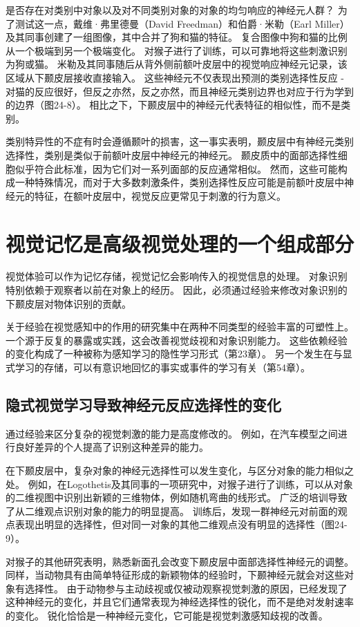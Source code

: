 是否存在对类别中对象以及对不同类别对象的对象的均匀响应的神经元人群？ 为了测试这一点，戴维·弗里德曼（David Freedman）和伯爵·米勒（Earl Miller）及其同事创建了一组图像，其中合并了狗和猫的特征。 复合图像中狗和猫的比例从一个极端到另一个极端变化。 对猴子进行了训练，可以可靠地将这些刺激识别为狗或猫。 米勒及其同事随后从背外侧前额叶皮层中的视觉响应神经元记录，该区域从下颞皮层接收直接输入。 这些神经元不仅表现出预测的类别选择性反应 - 对猫的反应很好，但反之亦然，反之亦然，而且神经元类别边界也对应于行为学到的边界（图24-8）。 相比之下，下颞皮层中的神经元代表特征的相似性，而不是类别。

类别特异性的不症有时会遵循颞叶的损害，这一事实表明，颞皮层中有神经元类别选择性，类别是类似于前额叶皮层中神经元的神经元。 颞皮质中的面部选择性细胞似乎符合此标准，因为它们对一系列面部的反应通常相似。 然而，这些可能构成一种特殊情况，而对于大多数刺激条件，类别选择性反应可能是前额叶皮层中神经元的特征，在额叶皮层中，视觉反应更常见于刺激的行为意义。

\section{视觉记忆是高级视觉处理的一个组成部分}
视觉体验可以作为记忆存储，视觉记忆会影响传入的视觉信息的处理。 对象识别特别依赖于观察者以前在对象上的经历。 因此，必须通过经验来修改对象识别的下颞皮层对物体识别的贡献。

关于经验在视觉感知中的作用的研究集中在两种不同类型的经验丰富的可塑性上。 一个源于反复的暴露或实践，这会改善视觉歧视和对象识别能力。 这些依赖经验的变化构成了一种被称为感知学习的隐性学习形式（第23章）。 另一个发生在与显式学习的存储，可以有意识地回忆的事实或事件的学习有关（第54章）。

\subsection{隐式视觉学习导致神经元反应选择性的变化}
通过经验来区分复杂的视觉刺激的能力是高度修改的。 例如，在汽车模型之间进行良好差异的个人提高了识别这种差异的能力。

在下颞皮层中，复杂对象的神经元选择性可以发生变化，与区分对象的能力相似之处。 例如，在Logothetis及其同事的一项研究中，对猴子进行了训练，可以从对象的二维视图中识别出新颖的三维物体，例如随机弯曲的线形式。 广泛的培训导致了从二维观点识别对象的能力的明显提高。 训练后，发现一群神经元对前面的观点表现出明显的选择性，但对同一对象的其他二维观点没有明显的选择性（图24-9）。

对猴子的其他研究表明，熟悉新面孔会改变下颞皮层中面部选择性神经元的调整。 同样，当动物具有由简单特征形成的新颖物体的经验时，下颞神经元就会对这些对象有选择性。 由于动物参与主动歧视或仅被动观察视觉刺激的原因，已经发现了这种神经元的变化，并且它们通常表现为神经选择性的锐化，而不是绝对发射速率的变化。 锐化恰恰是一种神经元变化，它可能是视觉刺激感知歧视的改善。

